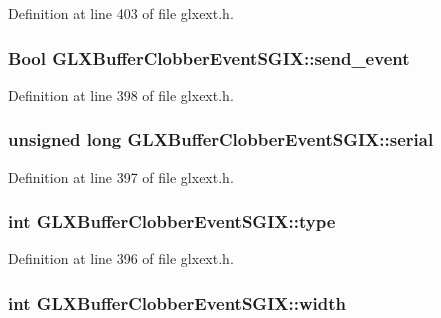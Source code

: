 Definition at line 403 of file glxext.h.

\hypertarget{struct_g_l_x_buffer_clobber_event_s_g_i_x_af43bf0edbe40a74ef58dfb546a75118b}{
\subsubsection[{send\_\-event}]{\setlength{\rightskip}{0pt plus 5cm}Bool {\bf GLXBufferClobberEventSGIX::send\_\-event}}}
\label{struct_g_l_x_buffer_clobber_event_s_g_i_x_af43bf0edbe40a74ef58dfb546a75118b}


Definition at line 398 of file glxext.h.

\hypertarget{struct_g_l_x_buffer_clobber_event_s_g_i_x_ac295e3276a7986eeae4d6a2a28c7e0b7}{
\subsubsection[{serial}]{\setlength{\rightskip}{0pt plus 5cm}unsigned long {\bf GLXBufferClobberEventSGIX::serial}}}
\label{struct_g_l_x_buffer_clobber_event_s_g_i_x_ac295e3276a7986eeae4d6a2a28c7e0b7}


Definition at line 397 of file glxext.h.

\hypertarget{struct_g_l_x_buffer_clobber_event_s_g_i_x_a36e3e8a5feea664623ea43d0f273b63a}{
\subsubsection[{type}]{\setlength{\rightskip}{0pt plus 5cm}int {\bf GLXBufferClobberEventSGIX::type}}}
\label{struct_g_l_x_buffer_clobber_event_s_g_i_x_a36e3e8a5feea664623ea43d0f273b63a}


Definition at line 396 of file glxext.h.

\hypertarget{struct_g_l_x_buffer_clobber_event_s_g_i_x_adad23535733161528427584a42bfc6eb}{
\subsubsection[{width}]{\setlength{\rightskip}{0pt plus 5cm}int {\bf GLXBufferClobberEventSGIX::width}}}
\label{struct_g_l_x_buffer_clobber_event_s_g_i_x_adad23535733161528427584a42bfc6eb}


